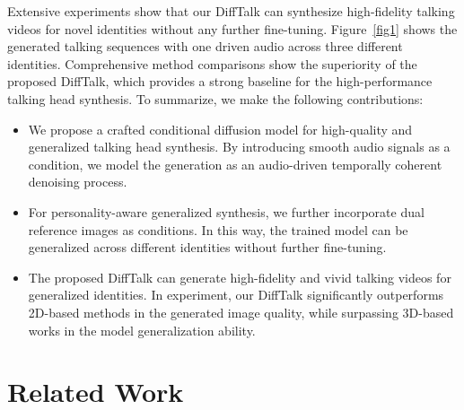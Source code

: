 \documentclass[10pt,twocolumn,letterpaper]{article}
\begin{document}
Extensive experiments show that our DiffTalk can synthesize high-fidelity talking videos for novel identities without any further fine-tuning. Figure~\ref{fig1} shows the generated talking sequences with one driven audio across three different identities.  Comprehensive method comparisons show the superiority of the proposed DiffTalk, which provides a strong baseline for the high-performance talking head synthesis.
To summarize, we make the following contributions:
\begin{itemize}[leftmargin=*]
\setlength{\itemsep}{0pt}
\setlength{\parsep}{0pt}
\setlength{\parskip}{0pt}
\item 
We propose a crafted conditional diffusion model for high-quality and generalized talking head synthesis. By introducing smooth audio signals as a condition, we model the generation as an audio-driven temporally coherent denoising process.

\item For personality-aware generalized synthesis, we further incorporate dual reference images as conditions. In this way, the trained model can be generalized across different identities without further fine-tuning. 

\item The proposed DiffTalk can generate high-fidelity and vivid talking videos for generalized identities. In experiment, our DiffTalk significantly outperforms 2D-based methods in the generated image quality, while surpassing 3D-based works in the model generalization ability.
\end{itemize}

\section{Related Work}
\end{document}
